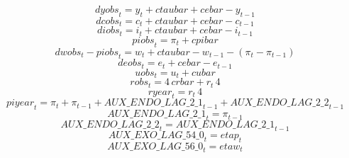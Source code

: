 \begin{dmath}
{dyobs}_{t}={{y}}_{t}+{ctaubar}+{cebar}-{{y}}_{t-1}
\end{dmath}
\begin{dmath}
{dcobs}_{t}={{c}}_{t}+{ctaubar}+{cebar}-{{c}}_{t-1}
\end{dmath}
\begin{dmath}
{diobs}_{t}={{i}}_{t}+{ctaubar}+{cebar}-{{i}}_{t-1}
\end{dmath}
\begin{dmath}
{piobs}_{t}={{\pi}}_{t}+{cpibar}
\end{dmath}
\begin{dmath}
{dwobs}_{t}-{piobs}_{t}={{w}}_{t}+{ctaubar}-{{w}}_{t-1}-\left({{\pi}}_{t}-{{\pi}}_{t-1}\right)
\end{dmath}
\begin{dmath}
{deobs}_{t}={{e}}_{t}+{cebar}-{{e}}_{t-1}
\end{dmath}
\begin{dmath}
{uobs}_{t}={{u}}_{t}+{cubar}
\end{dmath}
\begin{dmath}
{robs}_{t}=4\, {crbar}+{{r}}_{t}\, 4
\end{dmath}
\begin{dmath}
{ryear}_{t}={{r}}_{t}\, 4
\end{dmath}
\begin{dmath}
{piyear}_{t}={{\pi}}_{t}+{{\pi}}_{t-1}+{AUX\_ENDO\_LAG\_2\_1}_{t-1}+{AUX\_ENDO\_LAG\_2\_2}_{t-1}
\end{dmath}
\begin{dmath}
{AUX\_ENDO\_LAG\_2\_1}_{t}={{\pi}}_{t-1}
\end{dmath}
\begin{dmath}
{AUX\_ENDO\_LAG\_2\_2}_{t}={AUX\_ENDO\_LAG\_2\_1}_{t-1}
\end{dmath}
\begin{dmath}
{AUX\_EXO\_LAG\_54\_0}_{t}={etap}_{t}
\end{dmath}
\begin{dmath}
{AUX\_EXO\_LAG\_56\_0}_{t}={etaw}_{t}
\end{dmath}
